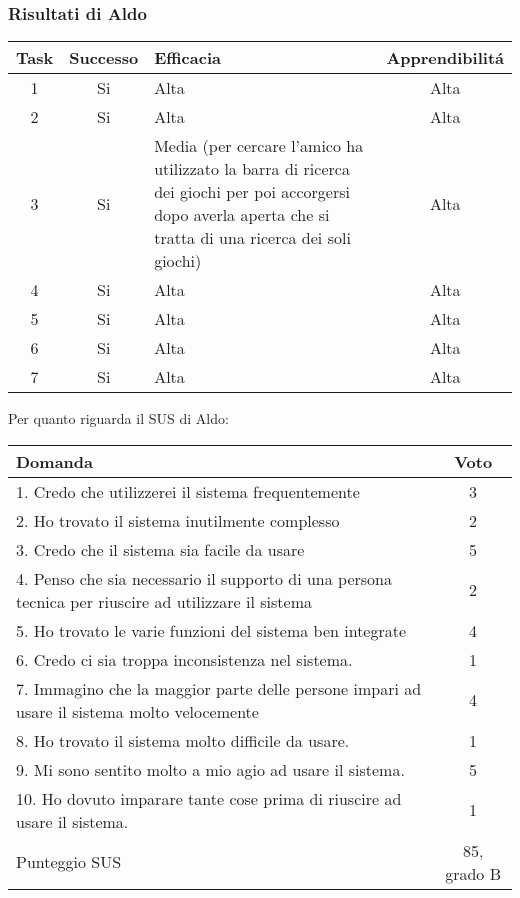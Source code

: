 \documentclass[../Report.tex]{subfiles}
\begin{document}
    \subsubsection{Risultati di Aldo}
    \begin{table}[H]
        \begin{tabular}{|c|c|p{5cm}|c|}
            \hline
            Task & Successo & Efficacia & Apprendibilitá \\
            \hline
            1 & Si & Alta & Alta \\
            \hline
            2 & Si & Alta & Alta \\
            \hline
            3 & Si & Media (per cercare l'amico ha utilizzato la barra di ricerca dei giochi per poi accorgersi dopo averla aperta che si tratta di una ricerca dei soli giochi) & Alta \\
            \hline
            4 & Si & Alta  & Alta \\
            \hline
            5 & Si  & Alta & Alta \\
            \hline
            6 & Si & Alta  & Alta \\
            \hline
            7 & Si & Alta & Alta \\
            \hline
        \end{tabular}
    \end{table}
    Per quanto riguarda il SUS di Aldo:
    \begin{table}[H]
        \begin{tabular}{|p{10cm}|c|}
            \hline
            \textbf{Domanda} & \textbf{Voto}\\
            \hline
            1. Credo che utilizzerei il sistema frequentemente & 3\\
            \hline
            2. Ho trovato il sistema inutilmente complesso & 2 \\
            \hline
            3. Credo che il sistema sia facile da usare & 5 \\
            \hline
            4. Penso che sia necessario il supporto di una persona tecnica per riuscire ad utilizzare il sistema & 2 \\
            \hline
            5. Ho trovato le varie funzioni del sistema ben integrate & 4 \\
            \hline
            6. Credo ci sia troppa inconsistenza nel sistema. & 1\\
            \hline
            7. Immagino che la maggior parte delle persone impari ad usare il sistema molto velocemente & 4 \\
            \hline
            8. Ho trovato il sistema molto difficile da usare. & 1 \\
            \hline
            9. Mi sono sentito molto a mio agio ad usare il sistema. & 5\\
            \hline
            10. Ho dovuto imparare tante cose prima di riuscire ad usare il sistema. & 1 \\ 
            \hline
            Punteggio SUS & 85, grado B \\
            \hline
        \end{tabular}
    \end{table}
\end{document}
